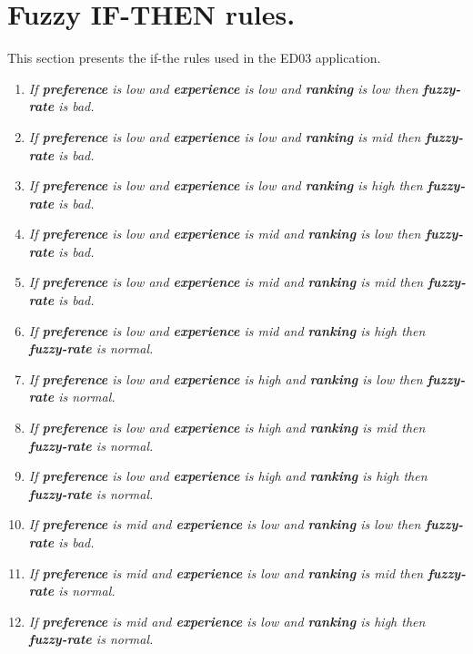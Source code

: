 
\chapter{Fuzzy IF-THEN rules.}\label{apendixb}

This section presents the if-the rules used in the ED03 application.

\begin{enumerate}
	\item \textit{If \textbf{preference} is low and
		\textbf{experience} is low and \textbf{ranking} is low then \textbf{fuzzy-rate} is bad.}
	\item \textit{If \textbf{preference} is low and
		\textbf{experience} is low and \textbf{ranking} is mid then \textbf{fuzzy-rate} is bad.}
	\item \textit{If \textbf{preference} is low and
		\textbf{experience} is low and \textbf{ranking} is high then \textbf{fuzzy-rate} is bad.}
	\item \textit{If \textbf{preference} is low and
		\textbf{experience} is mid and \textbf{ranking} is low then \textbf{fuzzy-rate} is bad.}
	\item \textit{If \textbf{preference} is low and
		\textbf{experience} is mid and \textbf{ranking} is mid then \textbf{fuzzy-rate} is bad.}
	\item \textit{If \textbf{preference} is low and
		\textbf{experience} is mid and \textbf{ranking} is high then \textbf{fuzzy-rate} is normal.}
	\item \textit{If \textbf{preference} is low and
		\textbf{experience} is high and \textbf{ranking} is low then \textbf{fuzzy-rate} is normal.}
	\item \textit{If \textbf{preference} is low and
		\textbf{experience} is high and \textbf{ranking} is mid then \textbf{fuzzy-rate} is normal.}
	\item \textit{If \textbf{preference} is low and
		\textbf{experience} is high and \textbf{ranking} is high then \textbf{fuzzy-rate} is normal.}
	\item \textit{If \textbf{preference} is mid and
		\textbf{experience} is low and \textbf{ranking} is low then \textbf{fuzzy-rate} is bad.}
	\item \textit{If \textbf{preference} is mid and
		\textbf{experience} is low and \textbf{ranking} is mid then \textbf{fuzzy-rate} is normal.}
	\item \textit{If \textbf{preference} is mid and
		\textbf{experience} is low and \textbf{ranking} is high then \textbf{fuzzy-rate} is normal.}

\end{enumerate}
